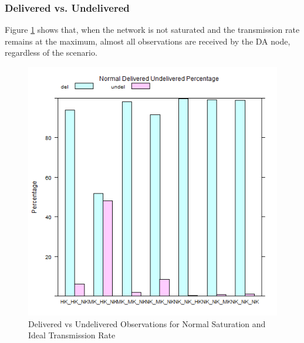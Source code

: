 \subsubsection{Delivered vs. Undelivered}
	Figure \ref{fig:sim:res:norm:ideal:delundel} shows that, when the network is not saturated and the transmission rate remains at the maximum, almost all observations are received by the DA node, regardless of the scenario. 
	\begin{figure}[H]
	\centering
	\includegraphics[width=\textwidth]{Chap7/figures/plots/normal_ideal/delvsundel_percent.png}
	\caption{Delivered vs Undelivered Observations for Normal Saturation and Ideal Transmission Rate}
	\label{fig:sim:res:norm:ideal:delundel}
	\end{figure}

